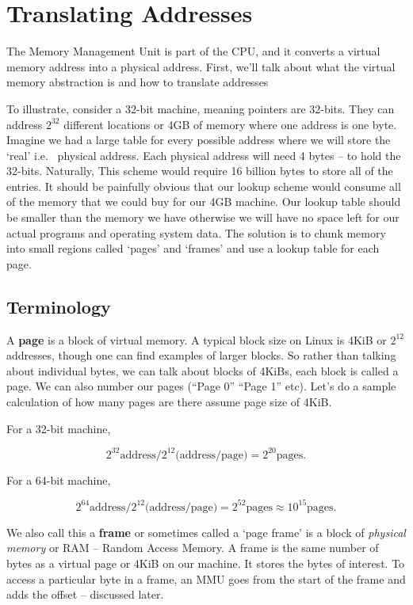 \section{Translating Addresses}
	 
The Memory Management Unit is part of the CPU, and it converts a virtual memory address into a physical address.
First, we'll talk about what the virtual memory abstraction is and how to translate addresses
	 
To illustrate, consider a 32-bit machine, meaning pointers are 32-bits.
They can address $2^{32}$ different locations or 4GB of memory where one address is one byte.
Imagine we had a large table for every possible address where we will store the `real' i.e. ~physical address.
Each physical address will need 4 bytes -- to hold the 32-bits.
Naturally, This scheme would require 16 billion bytes to store all of the entries.
It should be painfully obvious that our lookup scheme would consume all of the memory that we could buy for our 4GB machine.
Our lookup table should be smaller than the memory we have otherwise we will have no space left for our actual programs and operating system data.
The solution is to chunk memory into small regions called `pages' and `frames' and use a lookup table for each page.
	 
\subsection{Terminology}
	 
A \textbf{page} is a block of virtual memory.
A typical block size on Linux is 4KiB or $2^{12}$ addresses, though one can find examples of larger blocks.
So rather than talking about individual bytes, we can talk about blocks of 4KiBs, each block is called a page.
We can also number our pages (``Page 0'' ``Page 1'' etc). Let's do a sample calculation of how many pages are there assume page size of 4KiB.
	 
For a 32-bit machine,
	 
\[
	2^{32} \text{address} / 2^{12} \text{(address/page)} = 2^{20} \text{pages}.
\]
	 
For a 64-bit machine,
	 
\[
	2^{64} \text{address} / 2^{12} \text{(address/page)} = 2^{52} \text{pages} \approx 10^{15} \text{pages}.
\]
	 
We also call this a \textbf{frame} or sometimes called a `page frame' is a block of \emph{physical memory} or RAM -- Random Access Memory.
A frame is the same number of bytes as a virtual page or 4KiB on our machine.
It stores the bytes of interest.
To access a particular byte in a frame, an MMU goes from the start of the frame and adds the offset -- discussed later.
	 
